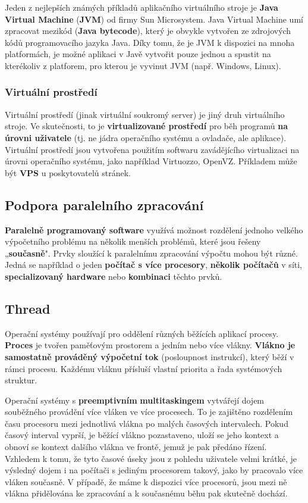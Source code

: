 Jeden z nejlepších známých příkladů aplikačního virtuálního stroje je \textbf{Java Virtual Machine} (\textbf{JVM}) od firmy Sun Microsystem. Java Virtual Machine umí zpracovat mezikód (\textbf{Java bytecode}), který je obvykle vytvořen ze zdrojových kódů programovacího jazyka Java. Díky tomu, že je JVM k dispozici na mnoha platformách, je možné aplikaci v Javě vytvořit pouze jednou a spustit na kterékoliv z platforem, pro kterou je vyvinut JVM (např. Windows, Linux).

\subsubsection{Virtuální prostředí}
Virtuální prostředí (jinak virtuální soukromý server) je jiný druh virtuálního stroje. Ve skutečnosti, to je \textbf{virtualizované prostředí} pro běh programů \textbf{na úrovni uživatele} (tj. ne jádra operačního systému a ovladače, ale aplikace). Virtuální prostředí jsou vytvořena použitím softwaru zavádějícího virtualizaci na úrovni operačního systému, jako například Virtuozzo, OpenVZ. Příkladem může být \textbf{VPS} u poskytovatelů stránek.

\subsection{Podpora paralelního zpracování}
\textbf{Paralelně programovaný software} využívá možnost rozdělení jednoho velkého výpočetního problému na několik menších problémů, které jsou řešeny „\textbf{současně}". Prvky sloužící k paralelnímu zpracování výpočtu mohou být různé. Jedná se například o jeden \textbf{počítač s více procesory}, \textbf{několik počítačů }v síti, \textbf{specializovaný hardware} nebo \textbf{kombinaci} těchto prvků.

\subsection{Thread}
Operační systémy používají pro oddělení různých běžících aplikací procesy. \textbf{Proces} je tvořen paměťovým prostorem a jedním nebo více vlákny. \textbf{Vlákno je samostatně prováděný výpočetní tok} (posloupnost instrukcí), který běží v rámci procesu. Každému vláknu přísluší vlastní priorita a řada systémových struktur.

Operační systémy s \textbf{preemptivním} \textbf{multitaskingem} vytvářejí dojem souběžného provádění více vláken ve více procesech. To je zajištěno rozdělením času procesoru mezi jednotlivá vlákna po malých časových intervalech. Pokud časový interval vyprší, je běžící vlákno pozastaveno, uloží se jeho kontext a obnoví se kontext dalšího vlákna ve frontě, jemuž je pak předáno řízení. Vzhledem k tomu, že tyto časové úseky jsou z pohledu uživatele velmi krátké, je výsledný dojem i na počítači s jediným procesorem takový, jako by pracovalo více vláken současně. V případě, že máme k dispozici více procesorů, jsou mezi ně vlákna přidělována ke zpracování a k současnému běhu pak skutečně dochází.

